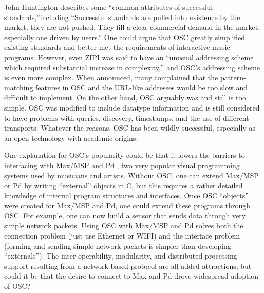 John Huntington \cite{Huntington:2008} describes some ``common attributes of successful standards,''including ``Successful standards are pulled into existence by the market; they are not pushed. They fill a clear commercial demand in the market, especially one driven by users.'' One could argue that OSC greatly simplified existing standards and better met the requirements of interactive music programs. However, even ZIPI was said to have an ``unusual addressing scheme which required substantial increase in complexity,'' \cite{Wikipedia:2014} and OSC's addressing scheme is even more complex. When announced, many complained that the pattern-matching features in OSC and the URL-like addresses would be too slow and difficult to implement. On the other hand, OSC arguably was and still is too simple. OSC was modified to include datatype information and is still considered to have problems with queries, discovery, timestamps, and the use of different transports. Whatever the reasons, OSC has been wildly successful, especially as an open technology with academic origins.

One explanation for OSC's popularity could be that it lowers the barriers to interfacing with Max/MSP and Pd \cite{Puckette:2002}, two very popular visual programming systems used by musicians and artists. Without OSC, one can extend Max/MSP or Pd by writing ``external'' objects in C, but this requires a rather detailed knowledge of internal program structures and interfaces. Once OSC ``objects'' were created for Max/MSP and Pd, one could extend these programs through OSC. For example, one can now build a sensor that sends data through very simple network packets. Using OSC with Max/MSP and Pd solves both the connection problem (just use Ethernet or WIFI) and the interface problem (forming and sending simple network packets is simpler than developing ``externals''). The inter-operability, modularity, and distributed processing support resulting from a network-based protocol are all added attractions, but could it be that the desire to connect to Max and Pd drove widespread adoption of OSC?

